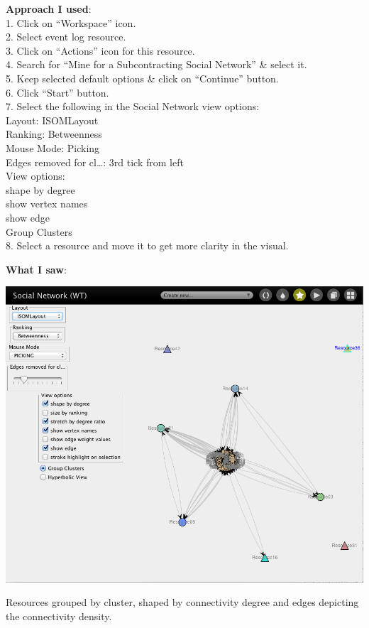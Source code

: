 \documentclass[]{article}
\begin{document}
\textbf{Approach I used}:\\1. Click on ``Workspace'' icon.\\2. Select
event log resource.\\3. Click on ``Actions'' icon for this resource.\\4.
Search for ``Mine for a Subcontracting Social Network'' \& select
it.\\5. Keep selected default options \& click on ``Continue''
button.\\6. Click ``Start'' button.\\7. Select the following in the
Social Network view options:\\ Layout: ISOMLayout\\ Ranking:
Betweenness\\ Mouse Mode: Picking\\ Edges removed for cl\ldots{}: 3rd
tick from left\\ View options:\\ shape by degree\\ show vertex names\\
show edge\\ Group Clusters\\8. Select a resource and move it to get more
clarity in the visual.

\textbf{What I saw}:

\includegraphics{CoSeLoG_Step_07_SocialNet.png}

Resources grouped by cluster, shaped by connectivity degree and edges
depicting the connectivity density.
\end{document}
